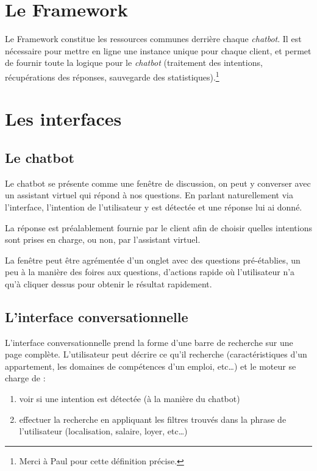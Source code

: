 \documentclass[12pt,a4paper,oneside]{scrreprt}
\begin{document}
\section{Le Framework}

Le Framework constitue les ressources communes derrière chaque \textit{chatbot}. Il est nécessaire pour mettre en ligne une instance unique pour chaque client, et permet de fournir toute la logique pour le \textit{chatbot} (traitement des intentions, récupérations des réponses, sauvegarde des statistiques).\footnote{Merci à Paul pour cette définition précise.}

\section{Les interfaces}
\subsection*{Le chatbot}

Le chatbot se présente comme une fenêtre de discussion, on peut y converser avec un assistant virtuel qui répond à nos questions. En parlant naturellement via l'interface, l'intention de l'utilisateur y est détectée et une réponse lui ai donné.

La réponse est préalablement fournie par le client afin de choisir quelles intentions sont prises en charge, ou non, par l'assistant virtuel.

La fenêtre peut être agrémentée d'un onglet avec des questions pré-établies, un peu à la manière des foires aux questions, d'actions rapide où l'utilisateur n'a qu'à cliquer dessus pour obtenir le résultat rapidement.

\subsection*{L'interface conversationnelle}
L'interface conversationnelle prend la forme d'une barre de recherche sur une page complète. L'utilisateur peut décrire ce qu'il recherche (caractéristiques d'un appartement, les domaines de compétences d'un emploi, etc\dots) et le moteur se charge de :
\begin{enumerate}
	\item voir si une intention est détectée (à la manière du chatbot)
	\item effectuer la recherche en appliquant les filtres trouvés dans la phrase de l'utilisateur (localisation, salaire, loyer, etc\dots)
\end{enumerate}
\end{document}

